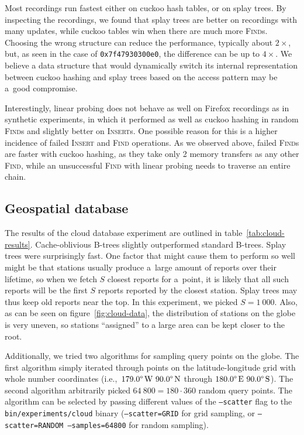 Most recordings run fastest either on cuckoo hash tables, or on splay trees.
By inspecting the recordings, we found that splay trees are better on recordings
with many updates, while cuckoo tables win when there are much more
\textsc{Find}s. Choosing the wrong structure can reduce the performance,
typically about $2\times$, but, as seen in the case of \texttt{0x7f47930300e0},
the difference can be up to $4\times$.
We believe a data structure that would dynamically switch
its internal representation between cuckoo hashing and splay trees
based on the access pattern may be a~good compromise.

Interestingly, linear probing does not behave as well on Firefox recordings
as in synthetic experiments, in which it performed as well as cuckoo hashing
in random \textsc{Find}s and slightly better on \textsc{Insert}s. One possible
reason for this is a higher incidence of failed \textsc{Insert} and
\textsc{Find} operations. As we observed above, failed \textsc{Find}s are
faster with cuckoo hashing, as they take only 2 memory transfers as any other
\textsc{Find}, while an unsuccessful \textsc{Find} with linear probing needs to
traverse an entire chain.

\subsection{Geospatial database}
The results of the cloud database experiment are outlined in
table~\ref{tab:cloud-results}. Cache-oblivious \mbox{B-trees} slightly outperformed
standard \mbox{B-trees}. Splay trees were surprisingly fast. One factor that
might cause them to perform so well might be that stations usually produce
a~large amount of reports over their lifetime, so when we fetch $S$ closest
reports for a~point, it is likely that all such reports will be the first $S$
reports reported by the closest station. Splay trees may thus keep old reports
near the top. In this experiment, we picked $S=1~000$. Also, as can be
seen on figure~\ref{fig:cloud-data}, the distribution of stations on the globe
is very uneven, so stations ``assigned'' to a large area can be kept closer to
the root.

Additionally, we tried two algorithms for sampling query points on the globe.
The first algorithm simply iterated through points on the latitude-longitude
grid with whole number coordinates (i.e.,\
$179.0\degree\,\text{W}\ 90.0\degree\,\text{N}$ through
$180.0\degree\,\text{E}\ 90.0\degree\,\text{S}$).
The second algorithm arbitrarily picked $64~800=180\cdot 360$ random query
points.
The algorithm can be selected by passing different values of the
\texttt{--scatter} flag to the \texttt{bin/experiments/cloud} binary
(\texttt{--scatter=GRID} for grid sampling, or \texttt{--scatter=RANDOM
--samples=64800} for random sampling).

